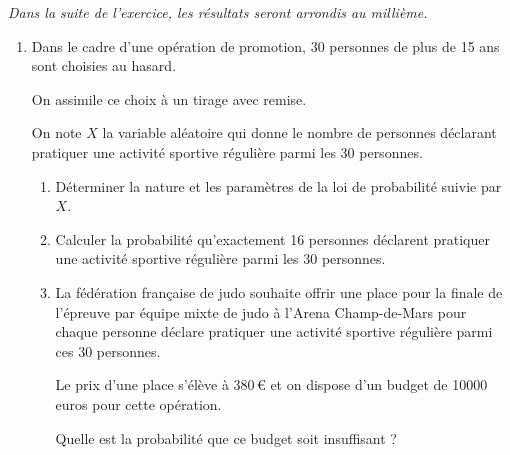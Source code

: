 \textit{Dans la suite de l'exercice, les résultats seront arrondis au millième.}

\begin{enumerate}[resume]
	\item Dans le cadre d'une opération de promotion, 30 personnes de plus de 15 ans sont choisies au hasard.
	
	On assimile ce choix à un tirage avec remise.
	
	On note $X$ la variable aléatoire qui donne le nombre de personnes déclarant pratiquer une activité sportive régulière parmi les 30 personnes.
	\begin{enumerate}
		\item Déterminer la nature et les paramètres de la loi de probabilité suivie par $X$.
		\item Calculer la probabilité qu'exactement 16 personnes déclarent pratiquer une activité sportive régulière parmi les 30 personnes.
		\item La fédération française de judo souhaite offrir une place pour la finale de l'épreuve par équipe mixte de judo à l'Arena Champ-de-Mars pour chaque personne déclare pratiquer une activité sportive régulière parmi ces 30 personnes.
		
		Le prix d'une place s'élève à 380\,€ et on dispose d'un budget de \num{10000} euros pour cette opération.
		
		Quelle est la probabilité que ce budget soit insuffisant ? 
	\end{enumerate}
\end{enumerate}